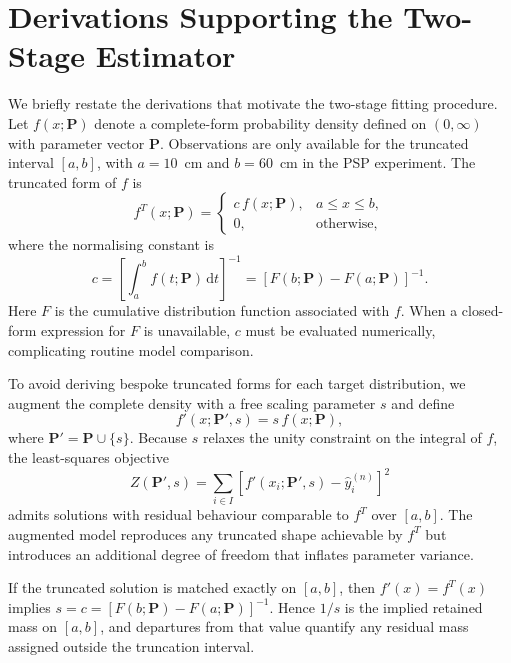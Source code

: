\section{Derivations Supporting the Two-Stage Estimator}

We briefly restate the derivations that motivate the two-stage fitting procedure. Let $f(x; \bm{P})$ denote a complete-form probability density defined on $(0, \infty)$ with parameter vector $\bm{P}$. Observations are only available for the truncated interval $[a, b]$, with $a = 10$~cm and $b = 60$~cm in the PSP experiment. The truncated form of $f$ is
\begin{equation}
  f^{T}(x; \bm{P}) =
    \begin{cases}
      c \, f(x; \bm{P}), & a \leq x \leq b, \\
      0, & \text{otherwise},
    \end{cases}
    \label{eq:truncated-density}
\end{equation}
where the normalising constant is
\begin{equation}
  c = \left[\int_a^b f(t; \bm{P}) \,\mathrm{d}t\right]^{-1} = \left[F(b; \bm{P}) - F(a; \bm{P})\right]^{-1}.
\end{equation}
Here $F$ is the cumulative distribution function associated with $f$. When a closed-form expression for $F$ is unavailable, $c$ must be evaluated numerically, complicating routine model comparison.

To avoid deriving bespoke truncated forms for each target distribution, we augment the complete density with a free scaling parameter $s$ and define
\begin{equation}
  f'(x; \bm{P}', s) = s \, f(x; \bm{P}),
\end{equation}
where $\bm{P}' = \bm{P} \cup \{s\}$. Because $s$ relaxes the unity constraint on the integral of $f$, the least-squares objective
\begin{equation}
  Z(\bm{P}', s) = \sum_{i \in I} \left[f'(x_i; \bm{P}', s) - \hat{y}_i^{(n)}\right]^2
\end{equation}
admits solutions with residual behaviour comparable to $f^{T}$ over $[a, b]$. The augmented model reproduces any truncated shape achievable by $f^{T}$ but introduces an additional degree of freedom that inflates parameter variance.

If the truncated solution is matched exactly on $[a,b]$, then $f'(x)=f^{T}(x)$ implies $s=c=[F(b;\bm{P})-F(a;\bm{P})]^{-1}$. Hence $1/s$ is the implied retained mass on $[a,b]$, and departures from that value quantify any residual mass assigned outside the truncation interval.

